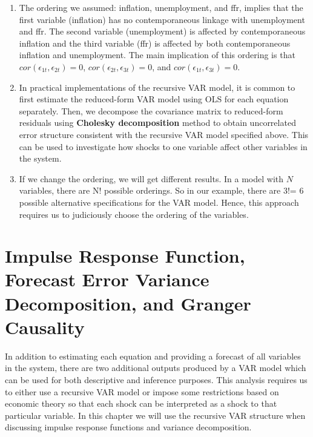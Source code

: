 \documentclass[]{book}
\theoremstyle{definition}
\theoremstyle{definition}
\theoremstyle{definition}
\theoremstyle{remark}
\begin{document}
\begin{enumerate}
\def\labelenumi{\arabic{enumi}.}
\item
  The ordering we assumed: inflation, unemployment, and ffr, implies that the first variable (inflation) has no contemporaneous linkage with unemployment and ffr. The second variable (unemployment) is affected by contemporaneous inflation and the third variable (ffr) is affected by both contemporaneous inflation and unemployment. The main implication of this ordering is that \(cor(\epsilon_{1t},\epsilon_{2t})=0\), \(cor(\epsilon_{2t},\epsilon_{3t})=0\), and \(cor(\epsilon_{1t},\epsilon_{3t})=0\).
\item
  In practical implementations of the recursive VAR model, it is common to first estimate the reduced-form VAR model using OLS for each equation separately. Then, we decompose the covariance matrix to reduced-form residuals using \textbf{Cholesky decomposition} method to obtain uncorrelated error structure consistent with the recursive VAR model specified above. This can be used to investigate how shocks to one variable affect other variables in the system.
\item
  If we change the ordering, we will get different results. In a model with \(N\) variables, there are N! possible orderings. So in our example, there are 3!= 6 possible alternative specifications for the VAR model. Hence, this approach requires us to judiciously choose the ordering of the variables.
\end{enumerate}

\hypertarget{impulse-response-function-forecast-error-variance-decomposition-and-granger-causality}{%
\section{Impulse Response Function, Forecast Error Variance Decomposition, and Granger Causality}\label{impulse-response-function-forecast-error-variance-decomposition-and-granger-causality}}

In addition to estimating each equation and providing a forecast of all variables in the system, there are two additional outputs produced by a VAR model which can be used for both descriptive and inference purposes. This analysis requires us to either use a recursive VAR model or impose some restrictions based on economic theory so that each shock can be interpreted as a shock to that particular variable. In this chapter we will use the recursive VAR structure when discussing impulse response functions and variance decomposition.
\end{document}
